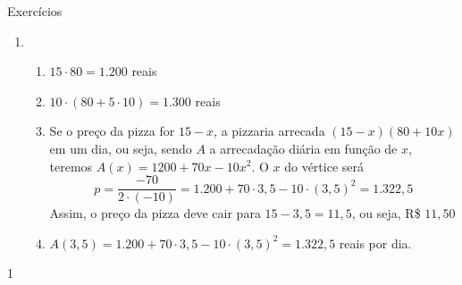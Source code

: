 {\begin{answer}{Exercícios}
{\begin{enumerate}[wide]
Os pontos fornecidos da função que representa o cabo em forma de arco são $(30,0)$, o vértice; $(0,20)$ e $(60,20)$. Usando o vértice fica $f(x)=a(x−30)2+0$. Pelo o ponto $(0,20)$, temos $f(0)=a(0-30)2=20\iff900a=20\iff a=145$. Como os pontos onde $x=10$ e $x=20$ são respectivamente simétricos de $x=50$ e $x=40$ vamos determinar as alturas dos apoios verticais somente dos dois primeiros $x$ citados e, por simetria, concluir os outros.

Para $x=10$ ou $x=50$, $f(10)=\dfrac{1}{45}(10-30)^2=\dfrac{400}{45}=\dfrac{80}{9}=8\cdot\dfrac{10}{9}=8$ m

Para $x=20$ ou $x=40$, $f(20)=\dfrac{1}{45}(20-30)^2=\dfrac{100}{45}=\dfrac{20}{9}=2\cdot\dfrac{10}{9}=2$ m

Para os quatro apois teremos $8+2+2+8=20$ m de um lado e $20$ m do outro, totalizando $40$ m.

Assim, o valor gasto com os apoios verticais será de $40\cdot500=20.000$ reais.

Obs.: Também é possível resolver o problema escolhendo o eixo x no topo da ponte. Assim, teríamos $V(30,−20)$, $(0,0)$ e $(60,0)$ como pontos conhecidos. Usando a forma $f(x)=a(x-x_1)(x-x_2)$ concluí-se ainda que os gastos com apoios verticais será R\$ $20.000{,}00$.


\item 
\begin{enumerate}[wide]
\item $15\cdot80=1.200$ reais
\item $10\cdot(80+5\cdot10)=1.300$ reais
\item Se o preço da pizza for $15-x$, a pizzaria arrecada $(15-x)(80+10x)$ em um dia, ou seja, sendo $A$ a arrecadação diária em função de $x$, teremos $A(x)=1200+70x−10x^2$. O $x$ do vértice será
\begin{equation*}
p=\frac{-70}{2\cdot(-10)}=1.200+70\cdot3{,}5-10\cdot(3{,}5)^2=1.322{,}5
\end{equation*}
Assim, o preço da pizza deve cair para $15-3{,}5=11{,}5$, ou seja, R\$ $11{,}50$

\item $A(3{,}5)=1.200+70\cdot3{,}5-10\cdot(3{,}5)^2=1.322{,}5$ reais por dia.
\end{enumerate}
\end{enumerate}
}{1}
\end{answer}

}
